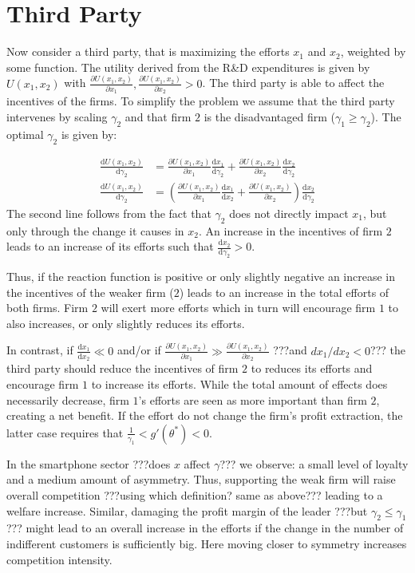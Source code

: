 \documentclass[a4paper, 11pt]{article}
\renewcommand{\d}{\text{d}}
\begin{document}
\section{Third Party}

Now consider a third party, that is maximizing the efforts $x_1$ and $x_2$, weighted by some function. The utility derived from the R\&D expenditures is given by $U(x_1,x_2)$ with $\frac{\partial U(x_1,x_2)}{\partial x_1},\frac{\partial U(x_1,x_2)}{\partial x_2}>0$. The third party is able to affect the incentives of the firms. To simplify the problem we assume that the third party intervenes by scaling $\gamma_2$ and that firm $2$ is the disadvantaged firm ($\gamma_1\geq\gamma_2$). The optimal $\gamma_2$ is given by:

\begin{align}
\frac{\d U(x_1,x_2)}{\d \gamma_2} &= \frac{\partial U(x_1,x_2)}{\partial x_1}\frac{\d x_1}{\d \gamma_2} + \frac{\partial U(x_1,x_2)}{\partial x_2}\frac{\d x_2}{\d \gamma_2}\\
\frac{\d U(x_1,x_2)}{\d \gamma_2} &= \left(\frac{\partial U(x_1,x_2)}{\partial x_1}\frac{\d x_1}{\d x_2}+ \frac{\partial U(x_1,x_2)}{\partial x_2}\right)\frac{\d x_2}{\d \gamma_2}
\end{align}
The second line follows from the fact that $\gamma_2$ does not directly impact $x_1$, but only through the change it causes in $x_2$. An increase in the incentives of firm $2$ leads to an increase of its efforts such that $\frac{\d x_2}{\d \gamma_2}>0$. 

Thus, if the reaction function is positive or only slightly negative an increase in the incentives of the weaker firm ($2$) leads to an increase in the total efforts of both firms. Firm $2$ will exert more efforts which in turn will encourage firm $1$ to also increases, or only slightly reduces its efforts. 

In contrast, if $\frac{\d x_1}{\d x_2}\ll0$ and/or if $\frac{\partial U(x_1,x_2)}{\partial x_1}\gg \frac{\partial U(x_1,x_2)}{\partial x_2}$ ???and $dx_1/dx_2<0$??? the third party should reduce the incentives of firm $2$ to reduces its efforts and encourage firm $1$ to increase its efforts. While the total amount of effects does necessarily decrease, firm $1$'s efforts are seen as more important than firm $2$, creating a net benefit. If the effort do not change the firm's profit extraction, the latter case requires that $\frac{1}{\gamma_1}<g'(\theta^*)<0$.

In the smartphone sector ???does $x$ affect $\gamma$??? we observe: a small level of loyalty and a medium amount of asymmetry. Thus, supporting the weak firm will raise overall competition ???using which definition? same as above??? leading to a welfare increase. Similar, damaging the profit margin of the leader ???but $\gamma_{2}\leq \gamma_1$??? might lead to an overall increase in the efforts if the change in the number of indifferent customers is sufficiently big. Here moving closer to symmetry increases competition intensity.
\end{document}
